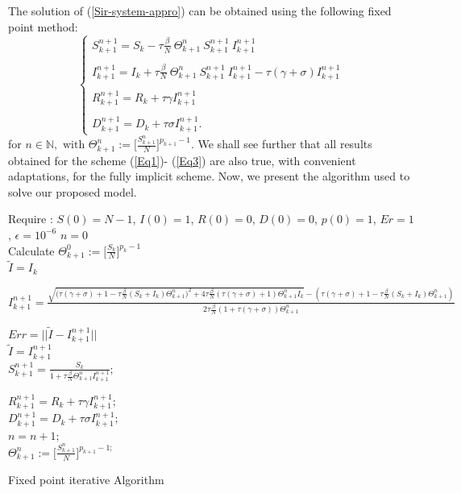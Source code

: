 \documentclass[final,a4paper,reqno]{elsarticle}
\numberwithin{equation}{section}
\newcommand{\N}{\ensuremath{\mathbb{N}}}
\begin{document}
\noindent The solution of (\ref{Sir-system-appro}) can be obtained using the following fixed point method:
\begin{equation}\label{Sir-system-fixed}
\begin{cases}
  \displaystyle S^{n+1}_{k+1} = S_{k} -\tau  \frac{\beta}{N}\: \Theta^{n}_{k+1} \: S^{n+1}_{k+1}\: I^{n+1}_{k+1}\\ \\
\displaystyle  I^{n+1}_{k+1} = I_{k} +\tau \frac{\beta}{N} \:\Theta^{n}_{k+1} \: S^{n+1}_{k+1} \: I^{n+1}_{k+1} -\tau (\gamma+\sigma) I^{n+1}_{k+1}\\ \\
\displaystyle  R^{n+1}_{k+1} = R_{k} +\tau  \gamma I^{n+1}_{k+1} \\ \\
\displaystyle  D^{n+1}_{k+1} = D_{k} +\tau  \sigma I^{n+1}_{k+1}.
\end{cases}
\end{equation}
for $\displaystyle n\in\N,   \mbox{  with }   \Theta^{n}_{k+1} :=\Big[\frac{S^{n}_{k+1}}{N}\Big]^{p_{k+1}-1}.$
We shall see further that all results obtained for the scheme  (\ref{Eq1})- (\ref{Eq3}) are also true, with convenient
adaptations, for the fully implicit scheme. Now, we present the algorithm used to solve our proposed model.

\begin{algorithm}[H]
	Require : $S(0)=N-1$, $I(0)=1$, $R(0)=0$, $D(0)=0$, $p(0)=1$, $Er=1$, $\epsilon=10^{-6}$ $n=0$ \\
	
	Calculate $\Theta^{0}_{k+1} :=\Big[\frac{S_{k}}{N}\Big]^{p_{k}-1}$ \\ 
	  $\displaystyle \tilde{I}=I_{k} $ \\
	{
	     
		$\displaystyle I^{n+1}_{k+1} =   \frac{\sqrt{\Big(\tau( \gamma+\sigma)+1-\tau \frac{ \beta}{N} (S_{k}+I_{k} )\Theta^{n}_{k+1}\Big)^2+4 \tau\frac{ \beta}{N}(\tau( \gamma+\sigma)+1) \Theta^{n}_{k+1}I_{k} } -(\tau(\gamma+\sigma)+1- \tau \frac{ \beta}{N}(S_{k}+I_{k} )\Theta^{n}_{k+1})}{2 \tau \frac{\beta}{N} (1+\tau(\gamma+\sigma))\Theta^{n}_{k+1}}$\;	
		
		$\displaystyle \textit{Err}=  || \tilde{I}-I^{n+1}_{k+1}|| $ \\
		  $\displaystyle \tilde{I}=I^{n+1}_{k+1} $ \\
		
		$\displaystyle S^{n+1}_{k+1} =  \frac{S_{k} }{1+\tau \frac{\beta}{N} \Theta^{n}_{k+1}I^{n+1}_{k+1}};$
		
		$\displaystyle R^{n+1}_{k+1} = R_{k}+\tau  \gamma  I^{n+1}_{k+1};$ \\
$\displaystyle  D^{n+1}_{k+1} = D_{k} +\tau  \sigma I^{n+1}_{k+1};$\\
$n=n+1;$\\
$ \displaystyle \Theta^{n}_{k+1} :=\Big[\frac{S^{n}_{k+1}}{N}\Big]^{p_{k+1}-1;}$ \\

	}
	\caption{Fixed point iterative Algorithm}
\end{algorithm}
\end{document}
